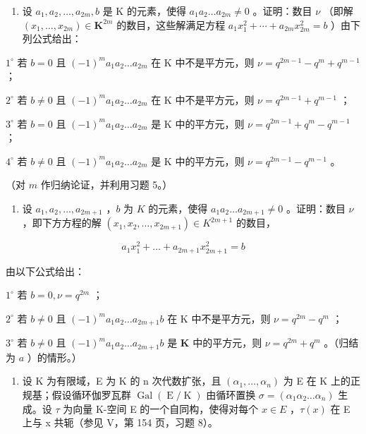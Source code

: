 \begin{enumerate}
\def\labelenumi{\alph{enumi})}
\tightlist
\item
  设 \(a_{1}, a_{2}, \ldots, a_{2m}, b\) 是 K 的元素，使得 \(a_{1}a_{2} \ldots a_{2m} \neq 0\) 。证明：数目 \(\nu\) （即解 \((x_{1}, \ldots, x_{2m}) \in \mathbf{K}^{2m}\) 的数目，这些解满足方程 \(a_{1}x_{1}^{2} + \cdots + a_{2m}x_{2m}^{2} = b\) ）由下列公式给出：
\end{enumerate}

\(1^{\circ}\) 若 \(b = 0\) 且 \((-1)^{m}a_{1}a_{2}\ldots a_{2m}\) 在 K 中不是平方元，则 \(\nu = q^{2m - 1} - q^{m} + q^{m - 1}\) ；

\(2^{\circ}\) 若 \(b \neq 0\) 且 \((-1)^{m}a_{1}a_{2} \ldots a_{2m}\) 在 K 中不是平方元，则 \(\nu = q^{2m-1} + q^{m-1}\) ；

\(3^{\circ}\) 若 \(b = 0\) 且 \((-1)^{m}a_{1}a_{2}\ldots a_{2m}\) 是 K 中的平方元，则 \(\nu = q^{2m - 1} + q^{m} - q^{m - 1}\) ；

\(4^{\circ}\) 若 \(b \neq 0\) 且 \((-1)^{m}a_{1}a_{2} \ldots a_{2m}\) 是 K 中的平方元，则 \(\nu = q^{2m - 1} - q^{m - 1}\) 。

（对 \(m\) 作归纳论证，并利用习题 5。）

\begin{enumerate}
\def\labelenumi{\alph{enumi})}
\setcounter{enumi}{1}
\tightlist
\item
  设 \(a_1, a_2, \ldots, a_{2m+1}\) ，\(b\) 为 \(K\) 的元素，使得 \(a_1a_2 \ldots a_{2m+1} \neq 0\) 。证明：数目 \(\nu\) ，即下方方程的解 \((x_1, x_2, \ldots, x_{2m+1}) \in K^{2m+1}\) 的数目，
\end{enumerate}

\[
a _ {1} x _ {1} ^ {2} + \dots + a _ {2 m + 1} x _ {2 m + 1} ^ {2} = b
\]

由以下公式给出：

\(1^{\circ}\) 若 \(b = 0, \nu = q^{2m}\) ；

\(2^{\circ}\) 若 \(b \neq 0\) 且 \((-1)^{m}a_{1}a_{2} \ldots a_{2m+1}b\) 在 K 中不是平方元，则 \(\nu = q^{2m} - q^{m}\) ；

\(3^{\circ}\) 若 \(b \neq 0\) 且 \((-1)^{m}a_{1}a_{2} \ldots a_{2m+1}b\) 是 \(\mathbf{K}\) 中的平方元，则 \(\nu = q^{2m} + q^{m}\) 。（归结为 \(a\) ）的情形。）

\begin{enumerate}
\def\labelenumi{\arabic{enumi})}
\setcounter{enumi}{6}
\tightlist
\item
  设 K 为有限域，E 为 K 的 n 次代数扩张，且 \((\alpha_{1}, \ldots, \alpha_{n})\) 为 E 在 K 上的正规基；假设循环伽罗瓦群 \(\operatorname{Gal}(\operatorname{E}/\operatorname{K})\) 由循环置换 \(\sigma = (\alpha_{1}\alpha_{2} \ldots \alpha_{n})\) 生成。设 \(\tau\) 为向量 K-空间 E 的一个自同构，使得对每个 \(x \in E\) ，\(\tau(x)\) 在 E 上与 x 共轭（参见 V，第 154 页，习题 8）。
\end{enumerate}

